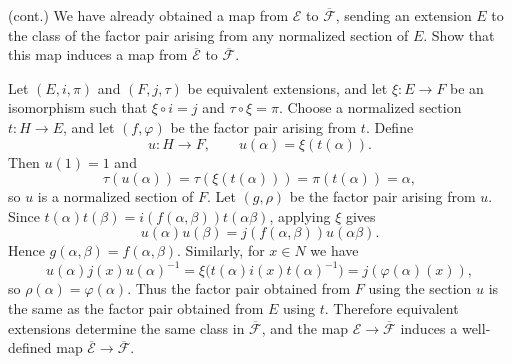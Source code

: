 \documentclass[../Odyssey_Project.tex]{subfiles}
\begin{document}
\begin{exercise}
\label{ex:9.7}
(cont.) We have already obtained a map from $\mathcal{E}$ to $\overline{\mathcal{F}}$, sending an extension $E$ to the class of the factor pair arising from any normalized section of $E$. Show that this map induces a map from $\overline{\mathcal{E}}$ to $\overline{\mathcal{F}}$.
\end{exercise}
\begin{solution}
Let $(E,i,\pi)$ and $(F,j,\tau)$ be equivalent extensions, and let $\xi\colon E\to F$ be an isomorphism such that $\xi\circ i=j$ and $\tau\circ\xi=\pi$. Choose a normalized section $t\colon H\to E$, and let $(f,\varphi)$ be the factor pair arising from $t$. Define
\[
    u\colon H\to F,
    \qquad
    u(\alpha)=\xi(t(\alpha)).
\]
Then $u(1)=1$ and
\[
    \tau(u(\alpha))=\tau(\xi(t(\alpha)))=\pi(t(\alpha))=\alpha,
\]
so $u$ is a normalized section of $F$. Let $(g,\rho)$ be the factor pair arising from $u$. Since $t(\alpha)t(\beta)=i(f(\alpha,\beta))t(\alpha\beta)$, applying $\xi$ gives
\[
    u(\alpha)u(\beta)
    =
    j(f(\alpha,\beta))u(\alpha\beta).
\]
Hence $g(\alpha,\beta)=f(\alpha,\beta)$. Similarly, for $x\in N$ we have
\[
    u(\alpha)j(x)u(\alpha)^{-1}
    =
    \xi\bigl(t(\alpha)i(x)t(\alpha)^{-1}\bigr)
    =
    j(\varphi(\alpha)(x)),
\]
so $\rho(\alpha)=\varphi(\alpha)$. Thus the factor pair obtained from $F$ using the section $u$ is the same as the factor pair obtained from $E$ using $t$. Therefore equivalent extensions determine the same class in $\overline{\mathcal{F}}$, and the map $\mathcal{E}\to\overline{\mathcal{F}}$ induces a well-defined map $\overline{\mathcal{E}}\to\overline{\mathcal{F}}$.
\end{solution}
\end{document}
